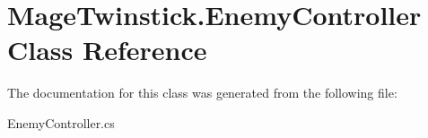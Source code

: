 \hypertarget{class_mage_twinstick_1_1_enemy_controller}{}\section{Mage\+Twinstick.\+Enemy\+Controller Class Reference}
\label{class_mage_twinstick_1_1_enemy_controller}


The documentation for this class was generated from the following file\+:\begin{DoxyCompactItemize}
\item 
Enemy\+Controller.\+cs\end{DoxyCompactItemize}
